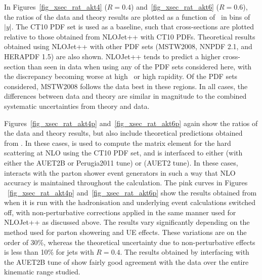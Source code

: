 In Figures~\ref{fig_xsec_rat_akt4} ($R=0.4$) and~\ref{fig_xsec_rat_akt6} ($R=0.6$), the ratios of the data and theory results are plotted as a function of \pt~in bins of $|y|$. The CT10 PDF set is used as a baseline, such that cross-sections are plotted relative to those obtained from NLOJet++ with CT10 PDFs. Theoretical results obtained using NLOJet++ with other PDF sets (MSTW2008, NNPDF 2.1, and HERAPDF 1.5) are also shown. NLOJet++ tends to predict a higher cross-section than seen in data when using any of the PDF sets considered here, with the discrepancy becoming worse at high \pt~or high rapidity. Of the PDF sets considered, MSTW2008 follows the data best in these regions. In all cases, the differences between data and theory are similar in magnitude to the combined systematic uncertainties from theory and data.

Figures~\ref{fig_xsec_rat_akt4p} and~\ref{fig_xsec_rat_akt6p} again show the ratios of the data and theory results, but also include theoretical predictions obtained from \powheg. In these cases, \powheg is used to compute the matrix element for the hard scattering at NLO using the CT10 PDF set, and is interfaced to either \pythia (with either the AUET2B or Perugia2011 tune) or \herwig (AUET2 tune). In these cases, \powheg interacts with the parton shower event generators in such a way that NLO accuracy is maintained throughout the calculation. The pink curves in Figures ~\ref{fig_xsec_rat_akt4p} and~\ref{fig_xsec_rat_akt6p} show the results obtained from \powheg when it is run with the hadronisation and underlying event calculations switched off, with non-perturbative corrections applied in the same manner used for NLOJet++ as discussed above. The \powheg results vary significantly depending on the method used for parton showering and UE effects. These variations are on the order of 30\%, whereas the theoretical uncertainty due to non-perturbative effects is less than 10\% for jets with $R=0.4$. The results obtained by interfacing \powheg with the AUET2B tune of \pythia show fairly good agreement with the data over the entire kinematic range studied.



%

